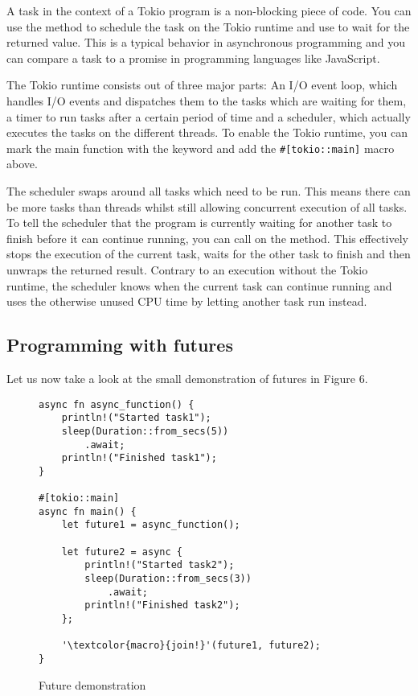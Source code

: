 A task in the context of a Tokio program is a non-blocking piece of code. You can use the 
method to schedule the task on the Tokio runtime and use  to wait for the returned value. This is a typical
behavior in asynchronous programming and you can compare a task to a promise in programming languages like JavaScript.

The Tokio runtime consists out of three major parts: An I/O event loop, which handles I/O events and dispatches them to
the tasks which are waiting for them, a timer to run tasks after a certain period of time and  a scheduler, which
actually executes the tasks on the different threads. To enable the Tokio runtime, you can mark the main function with
the  keyword and add the \texttt{#[tokio::main]} macro above.

The scheduler swaps around all tasks which need to be run. This means there can be more tasks than threads whilst still
allowing concurrent execution of all tasks. To tell the scheduler that the program is currently waiting for another
task to finish before it can continue running, you can call  on the method. This effectively stops the
execution of the current task, waits for the other task to finish and then unwraps the returned result. Contrary to an
execution without the Tokio runtime, the scheduler knows when the current task can continue running and uses the
otherwise unused CPU time by letting another task run instead.

\subsection{Programming with futures}
Let us now take a look at the small demonstration of futures in Figure 6.

\begin{figure}[ht]
    \begin{verbatim}
async fn async_function() {
    println!("Started task1");
    sleep(Duration::from_secs(5))
        .await;
    println!("Finished task1");
}

#[tokio::main]
async fn main() {
    let future1 = async_function();

    let future2 = async {
        println!("Started task2");
        sleep(Duration::from_secs(3))
            .await;
        println!("Finished task2");
    };

    '\textcolor{macro}{join!}'(future1, future2);
}
    \end{verbatim}
    \caption{Future demonstration}
\end{figure}

